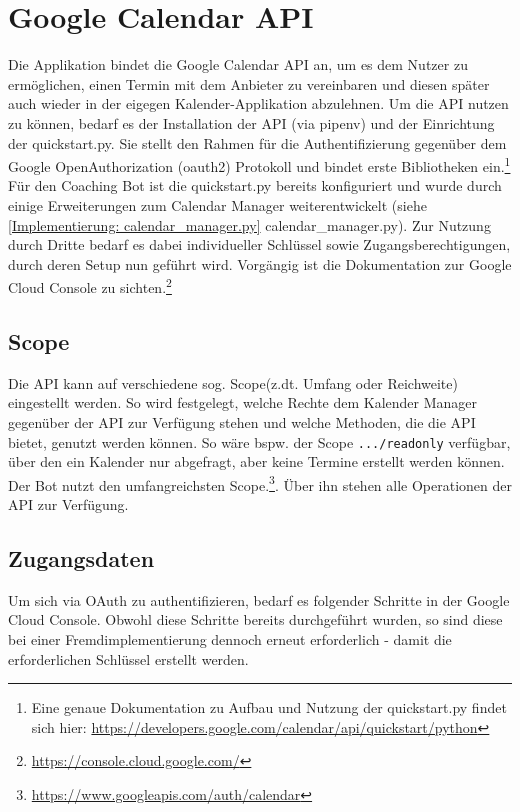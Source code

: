         
    \section{Google Calendar API} \label{Grundlagen: Google Calendar API}
        Die Applikation bindet die Google Calendar API \cite{googleCalAPI} an, um es dem Nutzer zu ermöglichen, einen Termin mit dem Anbieter zu vereinbaren und diesen später auch wieder in der eigegen Kalender-Applikation abzulehnen.
        Um die API nutzen zu können, bedarf es der Installation der API (via pipenv) und der Einrichtung der quickstart.py. Sie stellt den Rahmen für die Authentifizierung gegenüber dem Google Open\-Authorization (oauth2) Protokoll und bindet erste Bibliotheken ein.\footnote{Eine genaue Dokumentation zu Aufbau und Nutzung der quickstart.py findet sich hier: \url{https://developers.google.com/calendar/api/quickstart/python}}
        Für den Coaching Bot ist die quickstart.py bereits konfiguriert und wurde durch einige Erweiterungen zum Calendar Manager weiterentwickelt (siehe \ref{Implementierung: calendar_manager.py} calendar\_manager.py). Zur Nutzung durch Dritte bedarf es dabei individueller Schlüssel sowie Zugangsberechtigungen, durch deren Setup nun geführt wird. Vorgängig ist die Dokumentation zur Google Cloud Console zu sichten.\footnote{\url{https://console.cloud.google.com/}}
        
        \subsection{Scope}
            Die API kann auf verschiedene sog. \glq Scope\grq (z.dt. Umfang oder Reichweite) eingestellt werden. So wird festgelegt, welche Rechte dem Kalender Manager gegenüber der API zur Verfügung stehen und welche Methoden, die die API bietet, genutzt werden können. So wäre bspw. der Scope \verb|.../readonly| verfügbar, über den ein Kalender nur abgefragt, aber keine Termine erstellt werden können. Der Bot nutzt den umfangreichsten Scope.\footnote{\url{https://www.googleapis.com/auth/calendar}}. Über ihn stehen alle Operationen der API zur Verfügung.
        
        \subsection{Zugangsdaten}
            Um sich via OAuth zu authentifizieren, bedarf es folgender Schritte in der Google Cloud Console. Obwohl diese Schritte bereits durchgeführt wurden, so sind diese bei einer Fremdimplementierung dennoch erneut erforderlich - damit die erforderlichen Schlüssel erstellt werden. 
        
